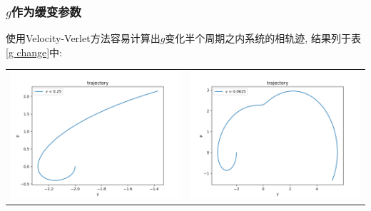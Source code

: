 \documentclass[a4paper,zihao=5,UTF8]{ctexart}
\begin{document}
    \subsubsection{$g$作为缓变参数}
    使用Velocity-Verlet方法容易计算出$g$变化半个周期之内系统的相轨迹, 结果列于表\ref{g change}中:
    \begin{table}[htbp]
        \centering
        \begin{tabular}[htbp]{cc}
            \includegraphics[scale=0.5]{3_traj_v=0_25.png} & \includegraphics[scale=0.5]{3_traj_v=0_0625.png} \\

\end{tabular}
\end{table}
\end{document}
